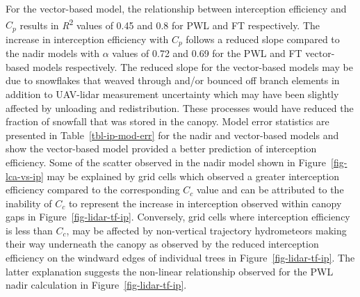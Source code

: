 \documentclass[
  letterpaper,
  DIV=11,
  numbers=noendperiod]{scrartcl}
\begin{document}
For the vector-based model, the relationship between interception
efficiency and \(C_p\) results in \emph{R}\textsuperscript{2} values of
0.45 and 0.8 for PWL and FT respectively. The increase in interception
efficiency with \(C_p\) follows a reduced slope compared to the nadir
models with \(\alpha\) values of 0.72 and 0.69 for the PWL and FT
vector-based models respectively. The reduced slope for the vector-based
models may be due to snowflakes that weaved through and/or bounced off
branch elements in addition to UAV-lidar measurement uncertainty which
may have been slightly affected by unloading and redistribution. These
processes would have reduced the fraction of snowfall that was stored in
the canopy. Model error statistics are presented in
Table~\ref{tbl-ip-mod-err} for the nadir and vector-based models and
show the vector-based model provided a better prediction of interception
efficiency. Some of the scatter observed in the nadir model shown in
Figure~\ref{fig-lca-vs-ip} may be explained by grid cells which observed
a greater interception efficiency compared to the corresponding \(C_c\)
value and can be attributed to the inability of \(C_c\) to represent the
increase in interception observed within canopy gaps in
Figure~\ref{fig-lidar-tf-ip}. Conversely, grid cells where interception
efficiency is less than \(C_c\), may be affected by non-vertical
trajectory hydrometeors making their way underneath the canopy as
observed by the reduced interception efficiency on the windward edges of
individual trees in Figure~\ref{fig-lidar-tf-ip}. The latter explanation
suggests the non-linear relationship observed for the PWL nadir
calculation in Figure~\ref{fig-lidar-tf-ip}.

\pagebreak
\end{document}
